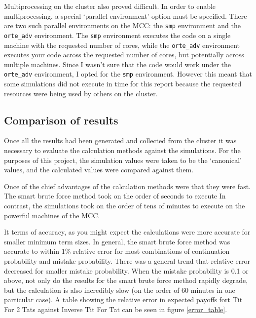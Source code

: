 \documentclass[a4paper,12pt]{article}
\begin{document}
Multiprocessing on the cluster also proved difficult.
In order to enable multiprocessing, a special `parallel environment' option must be specified.
There are two such parallel environments on the MCC: the \texttt{smp} environment and the \texttt{orte\_adv} environment.
The \texttt{smp} environment executes the code on a single machine with the requested number of cores, while the \texttt{orte\_adv} environment executes your code across the requested number of cores, but potentially across multiple machines.
Since I wasn't sure that the code would work under the \texttt{orte\_adv} environment, I opted for the \texttt{smp} environment.
However this meant that some simulations did not execute in time for this report because the requested resources were being used by others on the cluster.

\subsection{Comparison of results}

Once all the results had been generated and collected from the cluster it was necessary to evaluate the calculation methods against the simulations.
For the purposes of this project, the simulation values were taken to be the `canonical' values, and the calculated values were compared against them.

Once of the chief advantages of the calculation methods were that they were fast.
The smart brute force method took on the order of seconds to execute
In contrast, the simulations took on the order of tens of minutes to execute on the powerful machines of the MCC.

It terms of accuracy, as you might expect the calculations were more accurate for smaller minimum term sizes.
In general, the smart brute force method was accurate to within 1\% relative error for most combinations of continuation probability and mistake probability.
There was a general trend that relative error decreased for smaller mistake probability.
When the mistake probability is 0.1 or above, not only do the results for the smart brute force method rapidly degrade, but the calculation is also incredibly slow (on the order of 60 minutes in one particular case).
A table showing the relative error in expected payoffs fort Tit For 2 Tats against Inverse Tit For Tat can be seen in figure \ref{error_table}.
\end{document}
